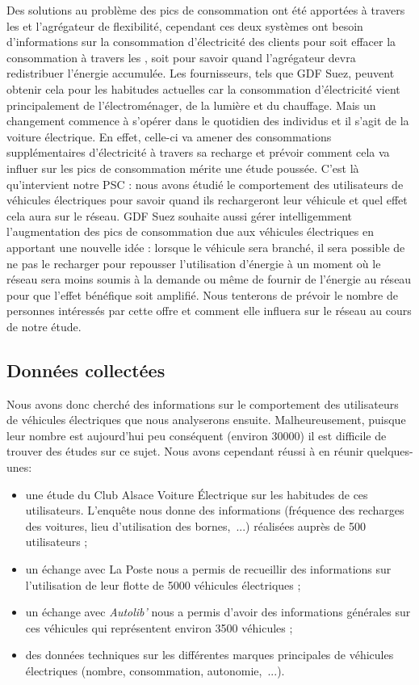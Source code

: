 Des solutions au problème des pics de consommation ont été apportées à travers les \smartgrids{} et l'agrégateur de flexibilité, cependant ces deux systèmes ont besoin d'informations sur la consommation d'électricité des clients pour soit effacer la consommation à travers les \smartgrids{}, soit pour savoir quand l'agrégateur devra redistribuer l'énergie accumulée. Les fournisseurs, tels que GDF Suez, peuvent obtenir cela pour les habitudes actuelles car la consommation d'électricité vient principalement de l'électroménager, de la lumière et du chauffage. Mais un changement commence à s'opérer dans le quotidien des individus et il s'agit de la voiture électrique. En effet, celle-ci va amener des consommations supplémentaires d'électricité à travers sa recharge et prévoir comment cela va influer sur les pics de consommation mérite une étude poussée. C'est là qu'intervient notre PSC : nous avons étudié le comportement des utilisateurs de véhicules électriques pour savoir quand ils rechargeront leur véhicule et quel effet cela aura sur le réseau. GDF Suez souhaite aussi gérer intelligemment l'augmentation des pics de consommation due aux véhicules électriques en apportant une nouvelle idée : lorsque le véhicule sera branché, il sera possible de ne pas le recharger pour repousser l'utilisation d'énergie à un moment où le réseau sera moins soumis à la demande ou même de fournir de l'énergie au réseau pour que l'effet bénéfique soit amplifié. Nous tenterons de prévoir le nombre de personnes intéressés par cette offre et comment elle influera sur le réseau au cours de notre étude.



\subsection{Données collectées}

Nous avons donc cherché des informations sur le comportement des utilisateurs de véhicules électriques que nous analyserons ensuite. Malheureusement, puisque leur nombre est aujourd'hui peu conséquent (environ \num{30000}) il est difficile de trouver des études sur ce sujet. Nous avons cependant réussi à en réunir quelques-unes:
\begin{itemize}
	\item une étude du Club Alsace Voiture \'Electrique \cite{clubalsace} sur les habitudes de ces utilisateurs. L'enquête nous donne des informations (fréquence des recharges des voitures, lieu d'utilisation des bornes,~...) réalisées auprès de 500 utilisateurs ;
	\item un échange avec La Poste nous a permis de recueillir des informations sur l'utilisation de leur flotte de \num{5000} véhicules électriques ;
	\item un échange avec \textit{Autolib'} nous a permis d'avoir des informations générales sur ces véhicules qui représentent environ \num{3500} véhicules ;
	\item des données techniques sur les différentes marques principales de véhicules électriques (nombre, consommation, autonomie,~...).
\end{itemize}
\bigskip

